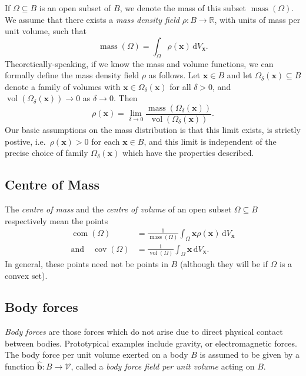 \documentclass[
  letterpaper,
  DIV=11,
  numbers=noendperiod]{scrreprt}
\theoremstyle{plain}
\theoremstyle{remark}
\begin{document}
If \(\Omega\subseteq B\) is an open subset of \(B\), we denote the mass
of this subset \({\operatorname{mass}}(\Omega)\). We assume that there
exists a \emph{mass density field} \(\rho:B\to{\mathbb{R}}\), with units
of mass per unit volume, such that
\[{\operatorname{mass}}(\Omega) = \int_\Omega \rho({\boldsymbol{x}}){\,{\mathrm{d}}V_{{\boldsymbol{x}}}}.\]
Theoretically-speaking, if we know the mass and volume functions, we can
formally define the mass density field \(\rho\) as follows. Let
\({\boldsymbol{x}}\in B\) and let
\(\Omega_\delta({\boldsymbol{x}})\subseteq B\) denote a family of
volumes with \({\boldsymbol{x}}\in\Omega_\delta({\boldsymbol{x}})\) for
all \(\delta>0\), and
\({\operatorname{vol}}(\Omega_\delta({\boldsymbol{x}}))\to0\) as
\(\delta\to0\). Then
\[\rho({\boldsymbol{x}}) = \lim_{\delta\to 0} \frac{{\operatorname{mass}}(\Omega_\delta({\boldsymbol{x}}))}{{\operatorname{vol}}(\Omega_\delta({\boldsymbol{x}}))}.\]
Our basic assumptions on the mass distribution is that this limit
exists, is strictly postive, i.e.~\(\rho({\boldsymbol{x}})>0\) for each
\({\boldsymbol{x}}\in B\), and this limit is independent of the precise
choice of family \(\Omega_\delta({\boldsymbol{x}})\) which have the
properties described.

\subsection{Centre of Mass}\label{centre-of-mass}

The \emph{centre of mass} and the \emph{centre of volume} of an open
subset \(\Omega\subseteq B\) respectively mean the points \[
\begin{aligned}
{\operatorname{com}}(\Omega) &= \frac{1}{{\operatorname{mass}}(\Omega)}\int_\Omega {\boldsymbol{x}}\rho({\boldsymbol{x}}){\,{\mathrm{d}}V_{{\boldsymbol{x}}}}\\
  \text{and}\quad {\operatorname{cov}}(\Omega) &= \frac{1}{{\operatorname{vol}}(\Omega)}\int_\Omega {\boldsymbol{x}}{\,{\mathrm{d}}V_{{\boldsymbol{x}}}}.
\end{aligned}\] In general, these points need not be points in \(B\)
(although they will be if \(\Omega\) is a convex set).

\subsection{Body forces}\label{body-forces}

\emph{Body forces} are those forces which do not arise due to direct
physical contact between bodies. Prototypical examples include gravity,
or electromagnetic forces. The body force per unit volume exerted on a
body \(B\) is assumed to be given by a function
\(\widehat{{\boldsymbol{b}}}:B\to{\mathcal{V}}\), called a \emph{body
force field per unit volume} acting on \(B\).
\end{document}
